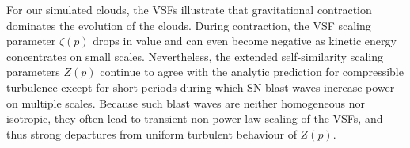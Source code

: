 For our simulated clouds, the VSFs illustrate that gravitational contraction dominates the evolution of the clouds.
During contraction, the VSF scaling parameter $\zeta(p)$ drops in value and can even become negative as kinetic energy concentrates on small scales.
Nevertheless, the extended self-similarity scaling parameters $Z(p)$ continue to agree with the analytic prediction for compressible turbulence except for short periods during which SN blast waves increase power on multiple scales.
Because such blast waves are neither homogeneous nor isotropic, they often lead to transient non-power law scaling of the VSFs, and thus strong departures from uniform turbulent behaviour of $Z(p)$.


\endinput
